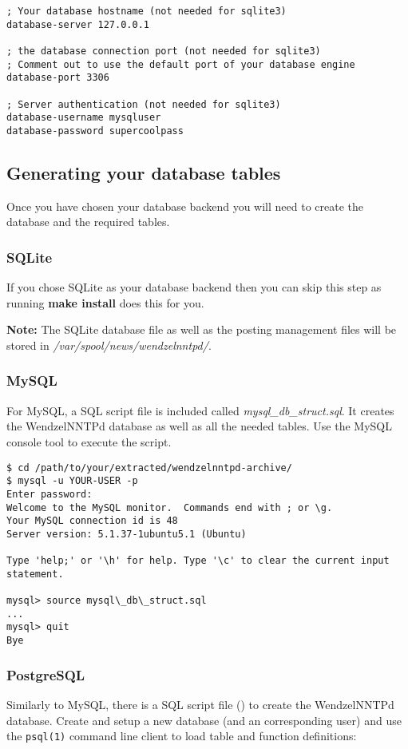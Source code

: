 \begin{verbatim}
; Your database hostname (not needed for sqlite3)
database-server 127.0.0.1

; the database connection port (not needed for sqlite3)
; Comment out to use the default port of your database engine
database-port 3306

; Server authentication (not needed for sqlite3)
database-username mysqluser
database-password supercoolpass
\end{verbatim}

\subsection{Generating your database tables}

Once you have chosen your database backend you will need to create the database and the required tables.

\subsubsection{SQLite}

If you chose SQLite as your database backend then you can skip this step as running \textbf{make install} does this for you.

\textbf{Note:} The SQLite database file as well as the posting management files will be stored in \textit{/var/spool/news/wendzelnntpd/}.

\subsubsection{MySQL}

For MySQL, a SQL script file is included called \textit{mysql\_db\_struct.sql}. It creates the WendzelNNTPd database as well as all the needed tables. Use the MySQL console tool to execute the script.

\begin{verbatim}
$ cd /path/to/your/extracted/wendzelnntpd-archive/
$ mysql -u YOUR-USER -p
Enter password:
Welcome to the MySQL monitor.  Commands end with ; or \g.
Your MySQL connection id is 48
Server version: 5.1.37-1ubuntu5.1 (Ubuntu)

Type 'help;' or '\h' for help. Type '\c' to clear the current input statement.

mysql> source mysql\_db\_struct.sql
...
mysql> quit
Bye
\end{verbatim}


\subsubsection{PostgreSQL}
Similarly to MySQL, there is a SQL script file () to create the WendzelNNTPd database. Create and setup a new database (and an corresponding user) and use the \texttt{psql(1)} command line client to load table and function definitions:

